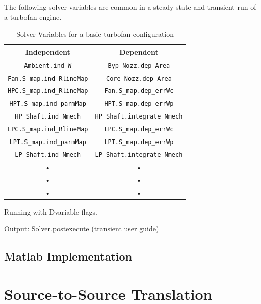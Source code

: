 \documentclass[heading.tex]{subfiles}
\begin{document}
The following solver variables are common in a steady-state and transient run of a turbofan engine.

\begin{table}[H]
\centering
\begin{tabular}{|c|c|}
\hline 
Independent & Dependent \\ 
\hline \hline
\texttt{Ambient.ind\_W} & \texttt{Byp\_Nozz.dep\_Area} \\ 
\hline 
\texttt{Fan.S\_map.ind\_RlineMap} & \texttt{Core\_Nozz.dep\_Area} \\ 
\hline 
\texttt{HPC.S\_map.ind\_RlineMap} & \texttt{Fan.S\_map.dep\_errWc} \\ 
\hline 
\texttt{HPT.S\_map.ind\_parmMap} & \texttt{HPT.S\_map.dep\_errWp} \\ 
\hline 
\texttt{HP\_Shaft.ind\_Nmech} & \texttt{HP\_Shaft.integrate\_Nmech} \\ 
\hline 
\texttt{LPC.S\_map.ind\_RlineMap} & \texttt{LPC.S\_map.dep\_errWc} \\ 
\hline 
\texttt{LPT.S\_map.ind\_parmMap} & \texttt{LPT.S\_map.dep\_errWp} \\ 
\hline 
\texttt{LP\_Shaft.ind\_Nmech} & \texttt{LP\_Shaft.integrate\_Nmech} \\ 
\hline 
• & • \\ 
\hline 
• & • \\ 
\hline 
• & • \\ 
\hline 
\end{tabular} 
\caption{Solver Variables for a basic turbofan configuration}
\label{tab:SolverVariables}
\end{table}

Running with Dvariable flags.

Output: Solver.postexecute (transient user guide)

\subsection{Matlab Implementation}

\section{Source-to-Source Translation}
\end{document}
